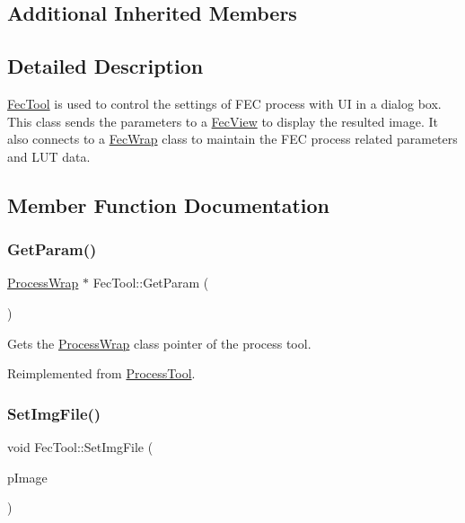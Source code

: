 \subsection*{Additional Inherited Members}


\subsection{Detailed Description}
\mbox{\hyperlink{class_fec_tool}{Fec\+Tool}} is used to control the settings of F\+EC process with UI in a dialog box. This class sends the parameters to a \mbox{\hyperlink{class_fec_view}{Fec\+View}} to display the resulted image. It also connects to a \mbox{\hyperlink{class_fec_wrap}{Fec\+Wrap}} class to maintain the F\+EC process related parameters and L\+UT data. 

\subsection{Member Function Documentation}
\mbox{\label{class_fec_tool_acccda5a312354ec0dcd215de8ed7ac03}} 
\subsubsection{\texorpdfstring{Get\+Param()}{GetParam()}}
{\footnotesize\ttfamily \mbox{\hyperlink{class_process_wrap}{Process\+Wrap}} $\ast$ Fec\+Tool\+::\+Get\+Param (\begin{DoxyParamCaption}{ }\end{DoxyParamCaption})\hspace{0.3cm}{\ttfamily [virtual]}}

Gets the \mbox{\hyperlink{class_process_wrap}{Process\+Wrap}} class pointer of the process tool. 

Reimplemented from \mbox{\hyperlink{class_process_tool_a355ebcf991f86f59f4241ea4345547fc}{Process\+Tool}}.

\mbox{\label{class_fec_tool_ac99805fa120b8bb7a21fc08382a875c1}} 
\subsubsection{\texorpdfstring{Set\+Img\+File()}{SetImgFile()}}
{\footnotesize\ttfamily void Fec\+Tool\+::\+Set\+Img\+File (\begin{DoxyParamCaption}\item[{Img\+File $\ast$}]{p\+Image }\end{DoxyParamCaption})\hspace{0.3cm}{\ttfamily [virtual]}}

